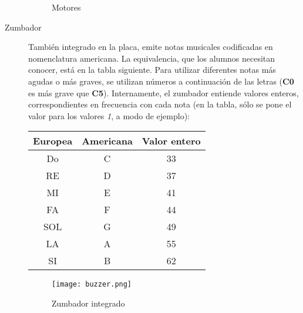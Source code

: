 \begin{description}
		\begin{figure}[H]
			\begin{center}
				\begin{subfigure}
					[Puerto de conexión de los motores]{
						\texttt{[image: puertomotor.png]}
						\label{img:puertomotor}}
				\end{subfigure}
				\begin{subfigure}
					[Motor DC]{			
						\texttt{[image: motorDC2.png]}
						\label{img:motor1}}
				\end{subfigure}
				\begin{subfigure}
					[Motor DC: montaje con rueda]{			
						\texttt{[image: motorDC.png]}
						\label{img:motor2}}
				\end{subfigure}
				\label{img:motores}
				\caption{Motores}
			\end{center}
		\end{figure}
	
	\item [Zumbador] También integrado en la placa, emite notas musicales codificadas en nomenclatura americana. La equivalencia, que los alumnos necesitan conocer, está en la tabla siguiente. Para utilizar diferentes notas más agudas o más graves, se utilizan números a continuación de las letras (\textbf{C0} es más grave que \textbf{C5}). Internamente, el zumbador entiende valores enteros, correspondientes en frecuencia con cada nota (en la tabla, sólo se pone el valor para los valores \textit{1}, a modo de ejemplo):
	\begin{center}
		\begin{tabular}{ c | c | c}	
			Europea & Americana & Valor entero \\
			\hline			
			Do & C & 33\\
			RE & D & 37\\
			MI & E & 41\\
			FA & F & 44\\
			SOL & G & 49\\
			LA & A & 55\\
			SI & B & 62\\
		\end{tabular}
	\end{center}

	
	\begin{figure}[H]
		\texttt{[image: buzzer.png]}
		\centering
		\label{img:zumbador}
		\caption{Zumbador integrado}
	\end{figure}
\end{description}
